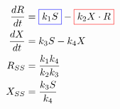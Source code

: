 \documentclass[preview]{standalone}
\begin{document}
\pagestyle{empty}
\begin{equation*}
\begin{aligned}
	\frac{dR}{dt} & = {\color{blue}\boxed{\color{black} k_1 S }} - \color{red}{\boxed{\color{black} k_2 X \cdot R}} \\ 
	\frac{dX}{dt} & = {k_3 S } - {k_4 X} \\ 
	R_{SS} & = \frac{k_1 k_4}{k_2 k_3} \\
	X_{SS} & = \frac{k_3 S}{k_4} \\
\end{aligned}
\end{equation*}
\vfill
\end{document}

